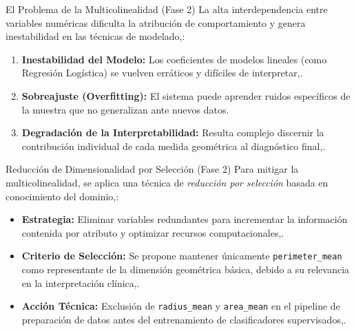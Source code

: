 \documentclass{beamer}
\begin{document}
		\begin{frame}{El Problema de la Multicolinealidad (Fase 2)}
		La alta interdependencia entre variables numéricas dificulta la atribución de comportamiento y genera inestabilidad en las técnicas de modelado,:
		
		\begin{enumerate}
			\item<2-> \textbf{Inestabilidad del Modelo:} Los coeficientes de modelos lineales (como Regresión Logística) se vuelven erráticos y difíciles de interpretar,.
			\item<3-> \textbf{Sobreajuste (Overfitting):} El sistema puede aprender ruidos específicos de la muestra que no generalizan ante nuevos datos.
			\item<4-> \textbf{Degradación de la Interpretabilidad:} Resulta complejo discernir la contribución individual de cada medida geométrica al diagnóstico final,.
		\end{enumerate}
	\end{frame}
	
	
	\begin{frame}{Reducción de Dimensionalidad por Selección (Fase 2)}
		Para mitigar la multicolinealidad, se aplica una técnica de \textit{reducción por selección} basada en conocimiento del dominio,:
		
		\begin{itemize}
			\item<2-> \textbf{Estrategia:} Eliminar variables redundantes para incrementar la información contenida por atributo y optimizar recursos computacionales,.
			\item<3-> \textbf{Criterio de Selección:} Se propone mantener únicamente \texttt{perimeter\_mean} como representante de la dimensión geométrica básica, debido a su relevancia en la interpretación clínica,.
			\item<4-> \textbf{Acción Técnica:} Exclusión de \texttt{radius\_mean} y \texttt{area\_mean} en el pipeline de preparación de datos antes del entrenamiento de clasificadores supervisados,.
		\end{itemize}
	\end{frame}
	
\end{document}
